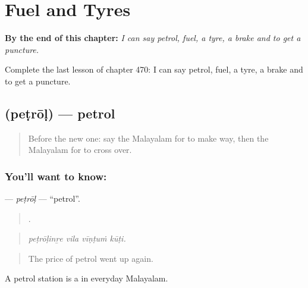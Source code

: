 
\chapter{Fuel and Tyres}
\label{ch:ml-fuel-and-tyres}

\begin{chapteropening}
\textbf{By the end of this chapter:} \emph{I can say petrol, fuel, a tyre, a brake and to get a puncture.}

Complete the last lesson of chapter 470: I can say petrol, fuel, a tyre, a brake and to get a puncture.
\end{chapteropening}

\section[\texorpdfstring{\ml{പെട്രോൾ} (peṭrōḷ)}{പെട്രോൾ (peṭrōḷ)}]{ (peṭrōḷ) — petrol}

\label{lesson:ML-C470-petrol}



\begin{quote}
Before the new one: say the Malayalam for to make way, then the Malayalam for to cross over.
\end{quote}

\subsection*{You'll want to know: }
\textbf{} — \emph{peṭrōḷ} — \textquotedblleft{}petrol\textquotedblright{}.

\begin{quote}
   .
\end{quote}

\begin{quote}
\emph{peṭrōḷinṟe vila vīṇṭuṁ kūṭi.}
\end{quote}

\begin{quote}
The price of petrol went up again.
\end{quote}

A petrol station is a   in everyday Malayalam.

